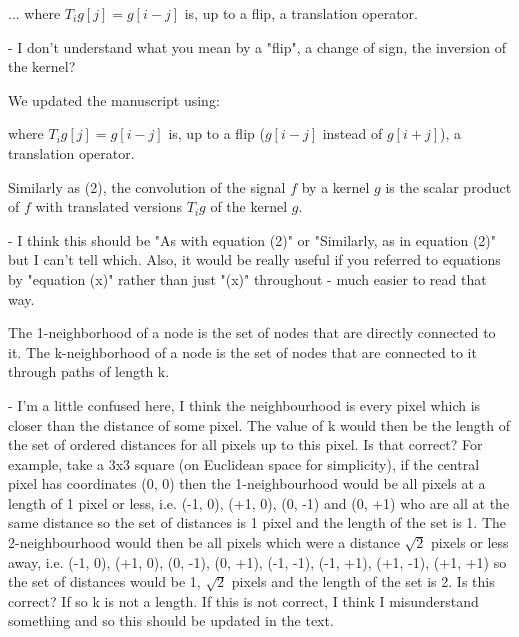 \documentclass[12pt,a4paper]{article}
\newcommand{\nati}[1]{{\color[rgb]{.1,.6,.1}{NP: #1}}}
\newcommand{\todo}[1]{{\color[rgb]{.6,.1,.6}{TODO: #1}}}
\newcommand{\1}{\b{1}}              %
\newcommand{\0}{\b{0}}              %
\begin{document}
\begin{mdframed}[style=comment] 
... where $T_ig[j]=g[i-j]$ is, up to a flip, a translation operator.

 - I don't understand what you mean by a "flip", a change of sign, the inversion of the kernel?
\end{mdframed}

We updated the manuscript using:
\begin{mdframed}[style=manuscript] 
where $T_i g[j] = g[i-j]$ is, up to a flip ($g[i-j]$ instead of $g[i+j]$), a translation operator.
\end{mdframed}

\begin{mdframed}[style=comment] 
Similarly as (2), the convolution of the signal $f$ by a kernel $g$ is the scalar product of $f$ with translated versions $T_ig$ of the kernel $g$.

- I think this should be "As with equation (2)" or "Similarly, as in equation (2)" but I can't tell which. Also, it would be really useful if you referred to equations by "equation (x)" rather than just "(x)" throughout - much easier to read that way.
\end{mdframed}
\todo{Assign: @michael, @tomek}
\nati{I do not know what we should do.}

\begin{mdframed}[style=comment] 
The 1-neighborhood of a node is the set of nodes that are directly connected to it. The k-neighborhood of a node is the set of nodes that are connected to it through paths of length k.

- I'm a little confused here, I think the neighbourhood is every pixel which is closer than the distance of some pixel. The value of k would then be the length of the set of ordered distances for all pixels up to this pixel. Is that correct? For example, take a 3x3 square (on Euclidean space for simplicity), if the central pixel has coordinates (0, 0) then the 1-neighbourhood would be all pixels at a length of 1 pixel or less, i.e. (-1, 0), (+1, 0), (0, -1) and (0, +1) who are all at the same distance so the set of distances is {1} pixel and the length of the set is 1. The 2-neighbourhood would then be all pixels which were a distance $\sqrt{2}$ pixels or less away, i.e. (-1, 0), (+1, 0), (0, -1), (0, +1), (-1, -1), (-1, +1), (+1, -1), (+1, +1) so the set of distances would be {1, $\sqrt{2}$} pixels and the length of the set is 2. Is this correct? If so k is not a length. If this is not correct, I think I misunderstand something and so this should be updated in the text.
\end{mdframed}
\todo{Assigned: @michael}
\end{document}
